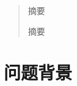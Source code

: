 \documentclass{MMCStyle}
\numberwithin{equation}{section}
\begin{document}
    \begin{abstract}

        摘要

        摘要
    \end{abstract}

    \tableofcontents
    \section{问题背景}
\end{document}
